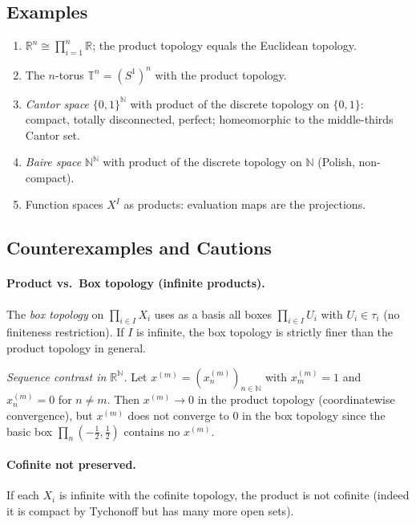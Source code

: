 \documentclass[12pt,a4paper]{article}
\theoremstyle{plain}
\theoremstyle{definition}
\theoremstyle{remark}
\theoremstyle{remark}
\begin{document}
\subsection*{Examples}
\begin{enumerate}
	\item $\mathbb{R}^n \cong \prod_{i=1}^n \mathbb{R}$; the product topology equals the Euclidean topology.
	\item The $n$-torus $\mathbb{T}^n=(S^1)^n$ with the product topology.
	\item \emph{Cantor space} $\{0,1\}^{\mathbb{N}}$ with product of the discrete topology on $\{0,1\}$: compact, totally disconnected, perfect; homeomorphic to the middle-thirds Cantor set.
	\item \emph{Baire space} $\mathbb{N}^{\mathbb{N}}$ with product of the discrete topology on $\mathbb{N}$ (Polish, non-compact).
	\item Function spaces $X^I$ as products: evaluation maps are the projections.
\end{enumerate}

\subsection*{Counterexamples and Cautions}
\paragraph{Product vs.\ Box topology (infinite products).}
The \emph{box topology} on $\prod_{i\in I}X_i$ uses as a basis all boxes $\prod_{i\in I} U_i$ with $U_i\in\tau_i$ (no finiteness restriction). If $I$ is infinite, the box topology is strictly finer than the product topology in general.

\smallskip
\emph{Sequence contrast in $\mathbb{R}^{\mathbb{N}}$.}
Let $x^{(m)}=(x^{(m)}_n)_{n\in\mathbb{N}}$ with $x^{(m)}_m=1$ and $x^{(m)}_n=0$ for $n\neq m$.
Then $x^{(m)}\to 0$ in the product topology (coordinatewise convergence), but $x^{(m)}$ does not converge to $0$ in the box topology since the basic box $\prod_{n}(-\tfrac12,\tfrac12)$ contains no $x^{(m)}$.

\paragraph{Cofinite not preserved.}
If each $X_i$ is infinite with the cofinite topology, the product is not cofinite (indeed it is compact by Tychonoff but has many more open sets).
\end{document}
